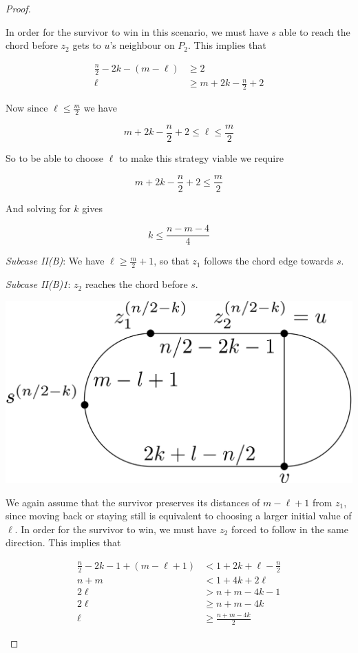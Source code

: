 \documentclass[letterpaper, 10pt]{article}
\begin{document}
\begin{proof}
\begin{proofpart}
In order for the survivor to win in this scenario, we must have $s$ able to
reach the chord before $z_2$ gets to $u$'s neighbour on $P_2$. This implies that

\begin{align*}
\frac{n}{2} - 2k - (m-\ell) & \geq 2                        \\
  \ell                        & \geq m + 2k - \frac{n}{2} + 2
\end{align*}

Now since $\ell \leq \frac{m}{2}$ we have

\[ m+2k-\frac{n}{2} +2 \leq \ell \leq \frac{m}{2} \]

So to be able to choose $\ell$ to make this strategy viable we require

\[ m+2k-\frac{n}{2} +2 \leq \frac{m}{2} \]

And solving for $k$ gives

\[ k \leq \frac{n-m-4}{4} \]

\emph{Subcase II(B)}: We have $\ell \geq \frac{m}{2}+1$, so that $z_1$ follows the chord edge towards $s$.

\emph{Subcase II(B)1}: $z_2$ reaches the chord before $s$.

\begin{center}
\includegraphics[scale=0.15]{diagramCaseIIB1_2}
\end{center}

We again assume that the survivor preserves its distances of $m-\ell+1$ from $z_1$,
since moving back or staying still is equivalent to choosing a larger initial value of $\ell$.
In order for the survivor to win, we must have $z_2$ forced to follow in the same direction.
This implies that

\begin{align*}
\frac{n}{2} -2k -1 + (m-\ell+1) & < 1 + 2k + \ell - \frac{n}{2} \\
n+m                          & < 1 + 4k + 2\ell              \\
2\ell                           & > n+m - 4k -1              \\
2\ell                           & \geq n+m -4k               \\
\ell                            & \geq \frac{n+m-4k}{2}
\end{align*}


\end{proofpart}
\end{proof}
\end{document}
